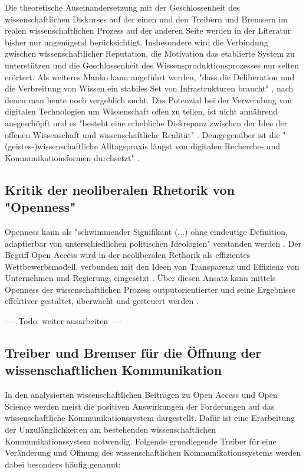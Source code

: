Die theoretische Auseinandersetzung mit der Geschlossenheit des wissenschaftlichen Diskurses auf der einen und den Treibern und Bremsern im realen wissenschaftlichen Prozess auf der anderen Seite werden in der Literatur bisher nur ungenügend berücksichtigt. Insbesondere wird die Verbindung zwischen wissenschaftlicher Reputation, die Motivation das etablierte System zu unterstützen und die Geschlossenheit des Wissensproduktionsprozesses nur selten erörtert. Als weiteres Manko kann angeführt werden, "dass die Deliberation und die Verbreitung von Wissen ein stabiles Set von Infrastrukturen braucht" \cite{kelty_2004}, nach denen man heute noch vergeblich sucht. Das Potenzial bei der Verwendung von digitalen Technologien um Wissenschaft offen zu teilen, ist nicht annährend ausgeschöpft und es "besteht eine erhebliche Diskrepanz zwischen der Idee der offenen Wissenschaft und wissenschaftliche Realität" \cite{Scheliga_2014}. Demgegenüber ist die "(geistes-)wissenschaftliche Alltagspraxis längst von digitalen Recherche- und Kommunikationsformen durchsetzt" \cite{hagner_2015_sache_buches}.

\subsection{Kritik der neoliberalen Rhetorik von "Openness"}

Openness kann als "schwimmender Signifikant (...) ohne eindeutige Definition, adaptierbar von unterschiedlichen politischen Ideologien" verstanden werden \cite{Adema_2014_open_access}. Der Begriff Open Access wird in der neoliberalen Rethorik als effizientes Wettbewerbsmodell, verbunden mit den Ideen von Transparenz und Effizienz von Unternehmen und Regierung, eingesetzt \cite{tkacz_2012_open}. Über diesen Ansatz kann mittels Openness der wissenschaftlichen Prozess outputorientierter und seine Ergebnisse effektiver gestaltet, überwacht und gesteuert werden \cite{adema_2010_oaoverview} .

---- Todo: weiter ausarbeiten ----

\subsection{Treiber und Bremser für die Öffnung der wissenschaftlichen Kommunikation}

In den analysierten wissenschaftlichen Beiträgen zu Open Access und Open Science werden meist die positiven Auswirkungen der Forderungen auf das wissenschaftliche Kommunikationssystem dargestellt. Dafür ist eine Erarbeitung der Unzulänglichkeiten am bestehenden wissenschaftlichen Kommunikationssystem notwendig\cite{cite:17}. Folgende grundlegende Treiber für eine Veränderung und Öffnung des wissenschaftlichen Kommunikationssystems werden dabei besonders häufig genannt:

